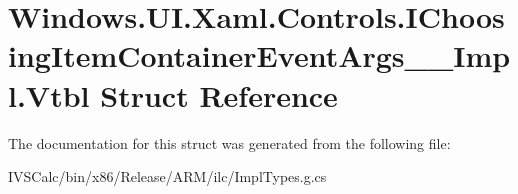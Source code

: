 \hypertarget{struct_windows_1_1_u_i_1_1_xaml_1_1_controls_1_1_i_choosing_item_container_event_args_____impl_1_1_vtbl}{}\section{Windows.\+U\+I.\+Xaml.\+Controls.\+I\+Choosing\+Item\+Container\+Event\+Args\+\_\+\+\_\+\+Impl.\+Vtbl Struct Reference}
\label{struct_windows_1_1_u_i_1_1_xaml_1_1_controls_1_1_i_choosing_item_container_event_args_____impl_1_1_vtbl}


The documentation for this struct was generated from the following file\+:\begin{DoxyCompactItemize}
\item 
I\+V\+S\+Calc/bin/x86/\+Release/\+A\+R\+M/ilc/Impl\+Types.\+g.\+cs\end{DoxyCompactItemize}
